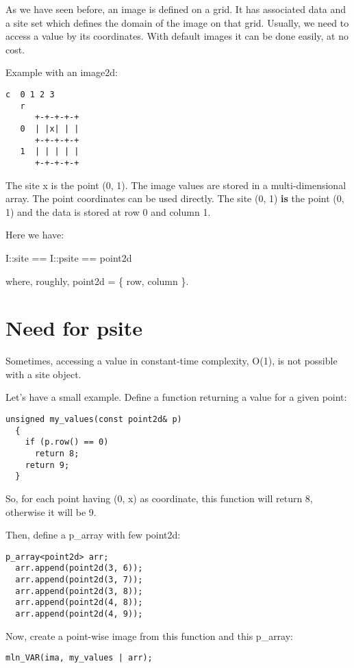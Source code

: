 \documentclass{report}
\begin{document}
As we have seen before, an image is defined on a grid. It has associated
data and a site set which defines the domain of the image on that grid.
Usually, we need to access a value by its coordinates. With default images it
can be done easily, at no cost.

Example with an image2d:

\begin{lstlisting}[frame=single]
    c  0 1 2 3
   r
      +-+-+-+-+
   0  | |x| | |
      +-+-+-+-+
   1  | | | | |
      +-+-+-+-+
\end{lstlisting}

The site x is the point (0, 1).  The image values are stored in a
multi-dimensional array. The point coordinates can be used directly. The site
(0, 1) \textbf{is} the point (0, 1) and the data is stored at row 0 and column
1.

Here we have:

  I::site == I::psite == point2d

where, roughly, point2d = \{ row, column \}.

\section{Need for psite}

Sometimes, accessing a value in constant-time complexity, O(1), is not
possible with a site object.

Let's have a small example. Define a function returning a value for a given
point:
\clearpage
\begin{lstlisting}[frame=single]
  unsigned my_values(const point2d& p)
  {
    if (p.row() == 0)
      return 8;
    return 9;
  }
\end{lstlisting}
So, for each point having (0, x) as coordinate, this function will return 8,
otherwise it will be 9.

Then, define a p\_array with few point2d:

\begin{lstlisting}[frame=single]
  p_array<point2d> arr;
  arr.append(point2d(3, 6));
  arr.append(point2d(3, 7));
  arr.append(point2d(3, 8));
  arr.append(point2d(4, 8));
  arr.append(point2d(4, 9));
\end{lstlisting}

Now, create a point-wise image from this function and this p\_array:
\begin{lstlisting}[frame=single]
  mln_VAR(ima, my_values | arr);
\end{lstlisting}
\end{document}
